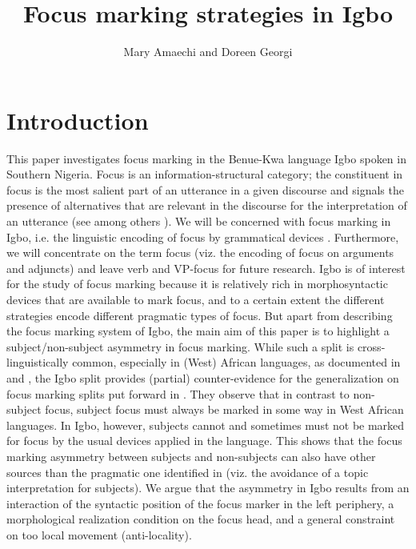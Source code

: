 \documentclass[output=paper,colorlinks,citecolor=brown]{langscibook}
\title{Focus marking strategies in Igbo}
\author{Mary Amaechi\affiliation{University of Ilorin} and Doreen Georgi\affiliation{University of Potsdam}}
\begin{document}
\maketitle 


\section{Introduction}\label{sec:amaechi:1}

This paper investigates focus marking in the Benue-Kwa language Igbo spoken in Southern Nigeria. Focus is an information-structural category; the constituent in focus is the most salient part of an utterance in a given discourse and signals the presence of alternatives that are relevant in the discourse for the interpretation of an utterance (see among others \citealt{Jackendoff1972, Dik1997, Rooth1985, Krifka2008, ZimmermannOnea2011}). We will be concerned with focus marking in Igbo, i.e. the linguistic encoding of focus by grammatical devices \citep{FiedlerEtAl2010}. Furthermore, we will concentrate on the term focus (viz. the encoding of focus on arguments and adjuncts) and leave verb and VP-focus for future research. Igbo is of interest for the study of focus marking because it is relatively rich in  morphosyntactic devices that are available to mark focus, and to a certain extent the different strategies encode different pragmatic types of focus. But apart from describing the focus marking system of Igbo, the main aim of this paper is to highlight a subject\slash non-subject asymmetry in focus marking. While such a split is cross-linguistically common, especially in (West) African languages, as documented in \citet{FiedlerEtAl2010} and \citet{Kalinowski2015}, the Igbo split provides (partial) counter-evidence for the generalization on focus marking splits put forward in \citet{FiedlerEtAl2010}. They observe that in contrast to non-subject focus, subject focus must always be marked in some way in West African languages. In Igbo, however, subjects cannot and sometimes must not be marked for focus by the usual devices applied in the language. This shows that the focus marking asymmetry between subjects and non-subjects can also have other sources than the pragmatic one identified in \citet{FiedlerEtAl2010} (viz. the avoidance of a topic interpretation for subjects). We argue that the asymmetry in Igbo results from an interaction of the syntactic position of the focus marker in the left periphery, a morphological realization condition on the focus head, and a general constraint on too local movement (anti-locality).
\end{document}
